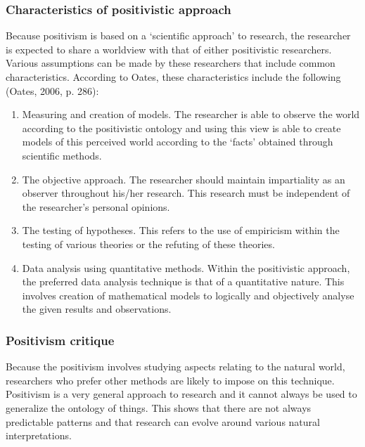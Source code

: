 \subsubsection{Characteristics of positivistic approach}
Because positivism is based on a ‘scientific approach’ to research, the researcher is expected to share a worldview with that of either positivistic researchers. Various assumptions can be made by these researchers that include common characteristics. According to Oates, these characteristics include the following (Oates, 2006, p. 286): 
\begin{enumerate}[label=\roman*.]
	\item Measuring and creation of models. The researcher is able to observe the world according to the positivistic ontology and using this view is able to create models of this perceived world according to the ‘facts’ obtained through scientific methods.
	\item The objective approach. The researcher should maintain impartiality as an observer throughout his/her research. This research must be independent of the researcher’s personal opinions.
	\item The testing of hypotheses. This refers to the use of empiricism within the testing of various theories or the refuting of these theories.
	\item Data analysis using quantitative methods. Within the positivistic approach, the preferred data analysis technique is that of a quantitative nature. This involves creation of mathematical models to logically and objectively analyse the given results and observations.
\end{enumerate}

\subsubsection{Positivism critique}
Because the positivism involves studying aspects relating to the natural world, researchers who prefer other methods are likely to impose on this technique. Positivism is a very general approach to research and it cannot always be used to generalize the ontology of things. This shows that there are not always predictable patterns and that research can evolve around various natural interpretations.
